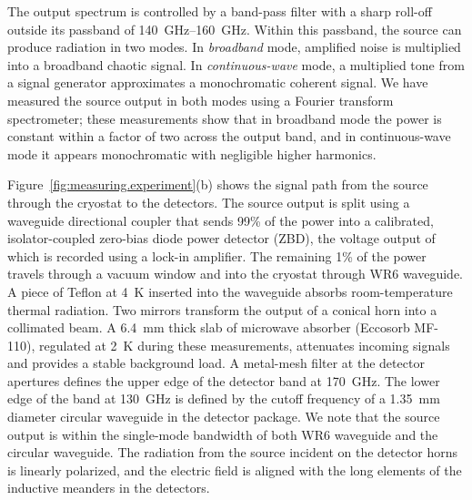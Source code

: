 The output spectrum is controlled by a band-pass filter with a sharp roll-off outside its passband of \SIrange{140}{160}{GHz}.
Within this passband, the source can produce radiation in two modes.
In \textit{broadband} mode, amplified noise is multiplied into a broadband chaotic signal.
In \textit{continuous-wave} mode, a multiplied tone from a signal generator approximates a monochromatic coherent signal.
We have measured the source output in both modes using a Fourier transform spectrometer; these measurements show that in broadband mode the power is constant within a factor of two across the output band, and in continuous-wave mode it appears monochromatic with negligible higher harmonics.

Figure~\ref{fig:measuring.experiment}(b) shows the signal path from the source through the cryostat to the detectors.
The source output is split using a waveguide directional coupler that sends 99\% of the power into a calibrated, isolator-coupled zero-bias diode power detector (ZBD), the voltage output of which is recorded using a lock-in amplifier.
The remaining 1\% of the power travels through a vacuum window and into the cryostat through WR6 waveguide.
A piece of Teflon at \SI{4}{K} inserted into the waveguide absorbs room-temperature thermal radiation.
Two mirrors transform the output of a conical horn into a collimated beam.
A \SI{6.4}{mm} thick slab of microwave absorber (Eccosorb MF-110), regulated at \SI{2}{K} during these measurements, attenuates incoming signals and provides a stable background load.
A metal-mesh filter at the detector apertures defines the upper edge of the detector band at \SI{170}{GHz}.
The lower edge of the band at \SI{130}{GHz} is defined by the cutoff frequency of a \SI{1.35}{mm} diameter circular waveguide in the detector package.
We note that the source output is within the single-mode bandwidth of both WR6 waveguide and the circular waveguide.
The radiation from the source incident on the detector horns is linearly polarized, and the electric field is aligned with the long elements of the inductive meanders in the detectors.


